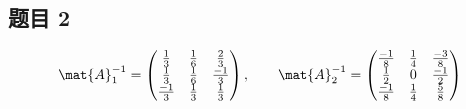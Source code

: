 \subsection*{题目 2}
\[
    \mat{A}_1^{-1} = \left(\begin{matrix}
        \frac{1}{3} & \frac{1}{6} & \frac{2}{3} \\
        \frac{1}{3} & \frac{1}{6} & \frac{-1}{3} \\
        \frac{-1}{3} & \frac{1}{3} & \frac{1}{3}
    \end{matrix}\right), \qquad 
    \mat{A}_2^{-1} = \left(\begin{matrix}
        \frac{-1}{8} & \frac{1}{4} & \frac{-3}{8} \\
        \frac{1}{2} & 0 & \frac{-1}{2} \\
        \frac{-1}{8} & \frac{1}{4} & \frac{5}{8}
    \end{matrix}\right)
\]

\newpage
